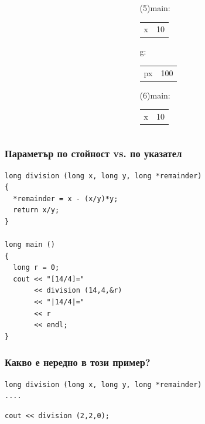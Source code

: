 \documentclass{beamer}
\begin{document}
\begin{frame}[fragile]
\begin{columns}[t]
\begin{column}{0.3\textwidth}
  \end{column}
  \begin{column}{0.3\textwidth}

\pause

  (5)main:

  \begin{tabular}{c|c}
  x & \alert{10}
  \end{tabular}

  g:

  \begin{tabular}{c|c}
  px & 100
  \end{tabular}

\vspace{10px}
\pause

  (6)main:

  \begin{tabular}{c|c}
  x & 10
  \end{tabular}


  \end{column}


\end{columns}




\end{frame}

\begin{frame}[fragile]
\frametitle{Параметър по стойност vs. по указател}

\begin{flushleft}
\begin{lstlisting}
long division (long x, long y, long *remainder)
{
  *remainder = x - (x/y)*y;
  return x/y;
}

long main ()
{
  long r = 0;
  cout << "[14/4]="
       << division (14,4,&r)
       << "|14/4|="
       << r
       << endl;
}
\end{lstlisting}
\end{flushleft}

\end{frame}


\begin{frame}[fragile]
\frametitle{Какво е нередно в този пример?}

\begin{flushleft}
\begin{lstlisting}
long division (long x, long y, long *remainder)
....
\end{lstlisting}
\end{flushleft}


\begin{center}
\begin{lstlisting}
cout << division (2,2,0);
\end{lstlisting}
\end{center}


\end{frame}
\end{document}
